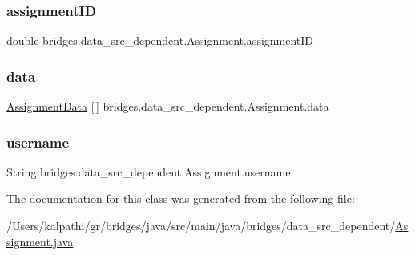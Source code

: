 \subsubsection{\texorpdfstring{assignmentID}{assignmentID}}
{\footnotesize\ttfamily double bridges.\+data\+\_\+src\+\_\+dependent.\+Assignment.\+assignment\+ID}

\mbox{\label{classbridges_1_1data__src__dependent_1_1_assignment_a23d503c5e6eae939bb8262dc8e18c259}} 
\subsubsection{\texorpdfstring{data}{data}}
{\footnotesize\ttfamily \mbox{\hyperlink{classbridges_1_1data__src__dependent_1_1_assignment_data}{Assignment\+Data}} \mbox{[}$\,$\mbox{]} bridges.\+data\+\_\+src\+\_\+dependent.\+Assignment.\+data}

\mbox{\label{classbridges_1_1data__src__dependent_1_1_assignment_aa7326ba8e0eb02fff4e5b22e4b89e61d}} 
\subsubsection{\texorpdfstring{username}{username}}
{\footnotesize\ttfamily String bridges.\+data\+\_\+src\+\_\+dependent.\+Assignment.\+username}



The documentation for this class was generated from the following file\+:\begin{DoxyCompactItemize}
\item 
/\+Users/kalpathi/gr/bridges/java/src/main/java/bridges/data\+\_\+src\+\_\+dependent/\mbox{\hyperlink{_assignment_8java}{Assignment.\+java}}\end{DoxyCompactItemize}
